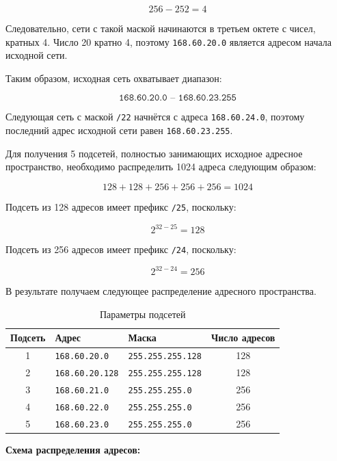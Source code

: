 \[
256 - 252 = 4
\]

Следовательно, сети с такой маской начинаются в третьем октете с чисел, кратных 4. Число 20 кратно 4, поэтому \texttt{168.60.20.0} является адресом начала исходной сети.

Таким образом, исходная сеть охватывает диапазон:

\[
\texttt{168.60.20.0 -- 168.60.23.255}
\]

Следующая сеть с маской \texttt{/22} начнётся с адреса \texttt{168.60.24.0}, поэтому последний адрес исходной сети равен \texttt{168.60.23.255}.

Для получения 5 подсетей, полностью занимающих исходное адресное пространство, необходимо распределить 1024 адреса следующим образом:

\[
128 + 128 + 256 + 256 + 256 = 1024
\]

Подсеть из 128 адресов имеет префикс \texttt{/25}, поскольку:

\[
2^{32-25} = 128
\]

Подсеть из 256 адресов имеет префикс \texttt{/24}, поскольку:

\[
2^{32-24} = 256
\]

В результате получаем следующее распределение адресного пространства.

\begin{table}[H]
\centering
\begin{tabular}{|c|l|l|c|}
\hline
\textbf{Подсеть} &
\textbf{Адрес} &
\textbf{Маска} &
\textbf{Число адресов} \\ \hline

1 &
\texttt{168.60.20.0} &
\texttt{255.255.255.128} &
128 \\ \hline

2 &
\texttt{168.60.20.128} &
\texttt{255.255.255.128} &
128 \\ \hline

3 &
\texttt{168.60.21.0} &
\texttt{255.255.255.0} &
256 \\ \hline

4 &
\texttt{168.60.22.0} &
\texttt{255.255.255.0} &
256 \\ \hline

5 &
\texttt{168.60.23.0} &
\texttt{255.255.255.0} &
256 \\ \hline

\end{tabular}
\caption{Параметры подсетей}
\label{tab:subnets}
\end{table}

\noindent\textbf{Схема распределения адресов:}

